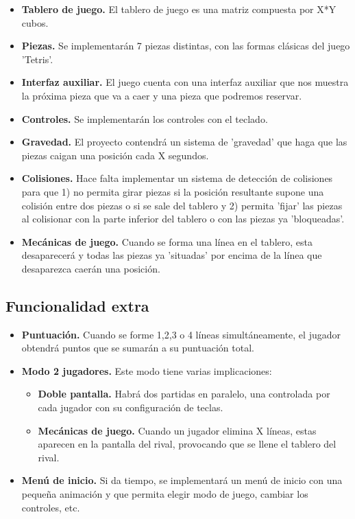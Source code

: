 \documentclass[11pt,a4paper]{article}
\begin{document}
\begin{itemize}
    \item \textbf{Tablero de juego.} El tablero de juego es una matriz compuesta por X*Y cubos. 
    \item \textbf{Piezas.} Se implementarán 7 piezas distintas, con las formas clásicas del juego 'Tetris'.
    \item \textbf{Interfaz auxiliar.} El juego cuenta con una interfaz auxiliar que nos muestra la próxima pieza que va a caer y una pieza que podremos reservar.
    \item \textbf{Controles.} Se implementarán los controles con el teclado.
    \item \textbf{Gravedad.} El proyecto contendrá un sistema de 'gravedad' que haga que las piezas caigan una posición cada X segundos.
    \item \textbf{Colisiones.} Hace falta implementar un sistema de detección de colisiones para que 1) no permita girar piezas si la posición resultante supone una colisión entre dos piezas o si se sale del tablero y 2) permita 'fijar' las piezas al colisionar con la parte inferior del tablero o con las piezas ya 'bloqueadas'.
    \item \textbf{Mecánicas de juego.} Cuando se forma una línea en el tablero, esta desaparecerá y todas las piezas ya 'situadas' por encima de la línea que desaparezca caerán una posición.
\end{itemize}

\subsection{Funcionalidad extra}

\begin{itemize}
    \item \textbf{Puntuación.} Cuando se forme 1,2,3 o 4 líneas simultáneamente, el jugador obtendrá puntos que se sumarán a su puntuación total.
    \item \textbf{Modo 2 jugadores.} Este modo tiene varias implicaciones:
        \begin{itemize}
            \item \textbf{Doble pantalla.} Habrá dos partidas en paralelo, una controlada por cada jugador con su configuración de teclas.
            \item \textbf{Mecánicas de juego.} Cuando un jugador elimina X líneas, estas aparecen en la pantalla del rival, provocando que se llene el tablero del rival.
        \end{itemize}
    \item \textbf{Menú de inicio.} Si da tiempo, se implementará un menú de inicio con una pequeña animación y que permita elegir modo de juego, cambiar los controles, etc.
\end{itemize}
\end{document}

